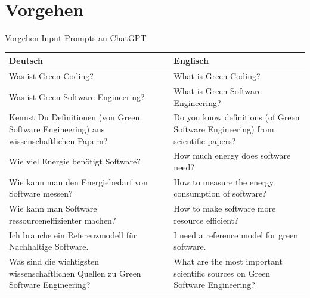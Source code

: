 \documentclass[10pt,aspectratio=169]{beamer}
\begin{document}
\section{Vorgehen}
\begin{frame}{Vorgehen}
    Input-Prompts an ChatGPT
    \small
    \begin{longtable}{|p{6.85cm}|p{6.85cm}|}
    \hline
    \textbf{Deutsch}                                                                       & \textbf{Englisch}\\\hline
    Was ist Green Coding?                                                                  & What is Green Coding? \\\hline
    Was ist Green Software Engineering?                                                    & What is Green Software Engineering?  \\\hline
    Kennst Du Definitionen (von Green Software Engineering) aus wissenschaftlichen Papern? & Do you know definitions (of Green Software Engineering) from scientific papers?          \\\hline
    Wie viel Energie benötigt Software?                                                    & How much energy does software need? \\\hline
    Wie kann man den Energiebedarf von Software messen?                                    & How to measure the energy consumption of software?  \\\hline
    Wie kann man Software ressourceneffizienter machen?                                    & How to make software more resource efficient? \\\hline
    Ich brauche ein Referenzmodell für Nachhaltige Software.                               & I need a reference model for green
    software.  \\\hline
    Was sind die wichtigsten wissenschaftlichen Quellen zu Green Software Engineering?     & What are the most  important scientific sources on Green Software Engineering?  \\\hline
    \end{longtable}
\end{frame}
\end{document}
